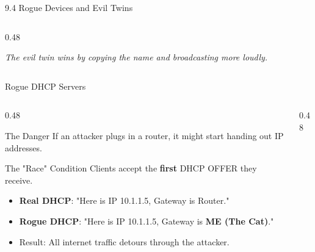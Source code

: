 \documentclass[aspectratio=169]{beamer}  %
\begin{document}
\begin{frame}{9.4 Rogue Devices and Evil Twins}
\begin{columns}[T]
\begin{column}{0.48\textwidth}
\begin{center}
            \end{center}
            \vspace{-0.2em}
            \centering\footnotesize\emph{The evil twin wins by copying the name and broadcasting more loudly.}
        \end{column}
    \end{columns}
\end{frame}

\begin{frame}{Rogue DHCP Servers}
    \begin{columns}[T]
        \begin{column}{0.48\textwidth}
            \begin{block}{The Danger}
                \footnotesize
                If an attacker plugs in a router, it might start handing out IP addresses.
            \end{block}
            \begin{alertblock}{The "Race" Condition}
                \footnotesize
                Clients accept the \textbf{first} DHCP OFFER they receive.
                \begin{itemize}
                    \item \textbf{Real DHCP}: "Here is IP 10.1.1.5, Gateway is Router."
                    \item \textbf{Rogue DHCP}: "Here is IP 10.1.1.5, Gateway is \textbf{ME (The Cat)}."
                    \item Result: All internet traffic detours through the attacker.
                \end{itemize}
            \end{alertblock}
        \end{column}
        \begin{column}{0.48\textwidth}
            \begin{center}
\end{center}
\end{column}
\end{columns}
\end{frame}
\end{document}

